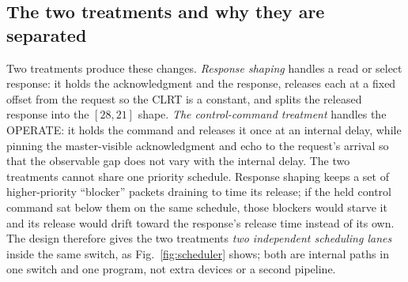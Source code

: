 \subsection{The two treatments and why they are separated}
Two treatments produce these changes. \emph{Response shaping} handles a read or select response: it
holds the acknowledgment and the response, releases each at a fixed offset from the request so the
CLRT is a constant, and splits the released response into the $[28,21]$ shape. \emph{The
control-command treatment} handles the OPERATE: it holds the command and releases it once at an
internal delay, while pinning the master-visible acknowledgment and echo to the request's arrival so
that the observable gap does not vary with the internal delay. The two treatments cannot share one
priority schedule. Response shaping keeps a set of higher-priority ``blocker'' packets draining to
time its release; if the held control command sat below them on the same schedule, those blockers
would starve it and its release would drift toward the response's release time instead of its own.
The design therefore gives the two treatments \emph{two independent scheduling lanes} inside the same
switch, as Fig.~\ref{fig:scheduler} shows; both are internal paths in one switch and one program, not
extra devices or a second pipeline.
